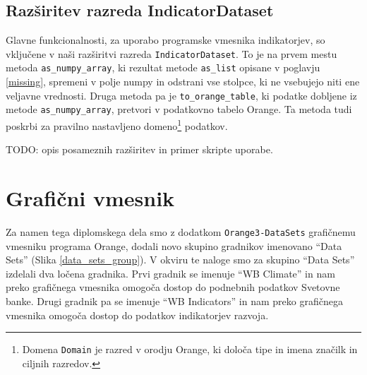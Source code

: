\subsection{Razširitev razreda IndicatorDataset}

Glavne funkcionalnosti, za uporabo programske vmesnika indikatorjev, so
vključene v naši razširitvi razreda \verb|IndicatorDataset|. To je na prvem
mestu metoda \verb|as_numpy_array|, ki rezultat metode \verb|as_list|
opisane v poglavju \ref{missing}, spremeni v polje numpy in odstrani vse
stolpce, ki ne vsebujejo niti ene veljavne vrednosti. Druga metoda pa je
\verb|to_orange_table|, ki podatke dobljene iz metode \verb|as_numpy_array|,
pretvori v podatkovno tabelo Orange. %
Ta metoda tudi poskrbi za pravilno nastavljeno domeno\footnote{Domena
\verb|Domain| je razred v orodju Orange, ki določa tipe in imena značilk in
ciljnih razredov.} podatkov.


TODO: opis posameznih razširitev in primer skripte uporabe.




% 
% 
% 
% 
% 
% 
% 
% 
% 
% 
% 





\section{Grafični vmesnik}

Za namen tega diplomskega dela smo z dodatkom \verb|Orange3-DataSets|
grafičnemu vmesniku programa Orange, dodali novo skupino gradnikov imenovano
``Data Sets'' (Slika \ref{data_sets_group}). V okviru te naloge smo za skupino
``Data Sets'' izdelali dva ločena gradnika. Prvi gradnik se imenuje ``WB
Climate'' in nam preko grafičnega vmesnika omogoča dostop do podnebnih 
podatkov Svetovne banke. Drugi gradnik pa se imenuje ``WB Indicators'' in nam
preko grafičnega vmesnika omogoča dostop do podatkov indikatorjev razvoja.
 
